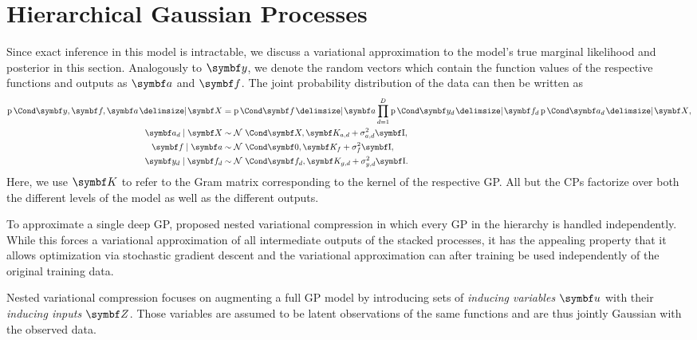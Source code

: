 \section{Hierarchical Gaussian Processes}
\label{toc:dgp}
Since exact inference in this model is intractable, we discuss a variational approximation to the model's true marginal likelihood and posterior in this section.
Analogously to $\mat{y}$, we denote the random vectors which contain the function values of the respective functions and outputs as $\rv{a}$ and $\rv{f}$.
The joint probability distribution of the data can then be written as
\begin{align}
    \begin{split}
        \label{eq:dgp:full_model}
        \Prob{\rv{y}, \rv{f}, \rv{a} \given \mat{X}} &=
        \Prob{\rv{f} \given \rv{a}} \prod_{d=1}^D \Prob{\rv{y_d} \given \rv{f_d}}\Prob{\rv{a_d} \given \rv{X}}, \\
        \rv{a_d} \mid \mat{X} &\sim \Gaussian{\mat{X}, \mat{K_{a, d}} + \sigma^2_{a, d}\Eye}, \\
        \rv{f} \mid \mat{a} &\sim \Gaussian{\mat{0}, \mat{K_f} + \sigma^2_f\Eye}, \\
        \rv{y_d} \mid \mat{f_d} &\sim \Gaussian{\mat{f_d}, \mat{K_{g, d}} + \sigma^2_{y, d}\Eye}.
    \end{split}
\end{align}
Here, we use $\mat{K}$ to refer to the Gram matrix corresponding to the kernel of the respective GP.
All but the CPs factorize over both the different levels of the model as well as the different outputs.

To approximate a single deep GP, \textcite{hensman_nested_2014} proposed nested variational compression in which every GP in the hierarchy is handled independently.
While this forces a variational approximation of all intermediate outputs of the stacked processes, it has the appealing property that it allows optimization via stochastic gradient descent \parencite{hensman_gaussian_2013} and the variational approximation can after training be used independently of the original training data.

Nested variational compression focuses on augmenting a full GP model by introducing sets of \emph{inducing variables} $\mat{u}$ with their \emph{inducing inputs} $\mat{Z}$.
Those variables are assumed to be latent observations of the same functions and are thus jointly Gaussian with the observed data.

